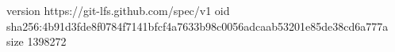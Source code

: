 version https://git-lfs.github.com/spec/v1
oid sha256:4b91d3fde8f0784f7141bfcf4a7633b98c0056adcaab53201e85de38cd6a777a
size 1398272
